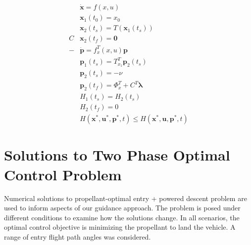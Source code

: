 \documentclass[]{article}
\newcommand{\state}{\ensuremath{\mathbf{x}}}
\newcommand{\control}{\ensuremath{\mathbf{u}}}
\newcommand{\costate}{\mathbf{p}}
\newcommand{\multiplier}{\mathbf{\lambda}}
\begin{document}
\begin{align}
&\dot{\state} = f(x,u) \\
&\state_1(t_0)  = x_0\\
&\state_2(t_s) = T(\state_1(t_s)) \\
C&\state_2(t_f) = \mathbf{0} \\
-&\dot{\costate} = f^T_x(x,u)\costate \\
&\costate_1(t_s) = T^T_{x_1}\costate_2(t_s) \label{eq_costate_transition} \\
&\costate_2(t_s) = -\nu\\
&\costate_2(t_f) =\Phi^T_x + C^T\multiplier\\
&H_1(t_s) = H_2(t_s) \\
&H_2(t_f) = 0 \\
&H(\state^*,\control^*,\costate^*, t) \le H(\state^*,\control,\costate^*, t)
\end{align}


\section{Solutions to Two Phase Optimal Control Problem}

Numerical solutions to propellant-optimal entry + powered descent problem are used to inform aspects of our guidance approach. The problem is posed under different conditions to examine how the solutions change. In all scenarios, the optimal control objective is minimizing the propellant to land the vehicle. A range of entry flight path angles was considered.


\end{document}
